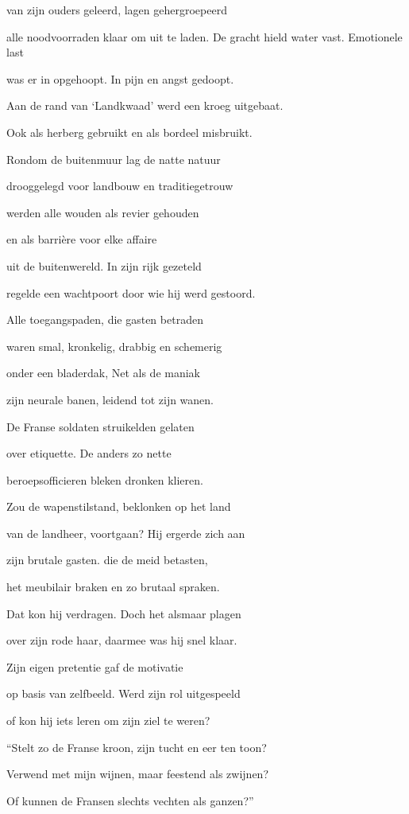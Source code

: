 van zijn ouders geleerd,
lagen gehergroepeerd

alle noodvoorraden
klaar om uit te laden.
De gracht hield water vast.
Emotionele last

was er in opgehoopt.
In pijn en angst gedoopt.

Aan de rand van ‘Landkwaad’
werd een kroeg uitgebaat.

Ook als herberg gebruikt
en als bordeel misbruikt.

Rondom de buitenmuur
lag de natte natuur

drooggelegd voor landbouw
en traditiegetrouw

werden alle wouden
als revier gehouden

en als barrière
voor elke affaire

uit de buitenwereld.
In zijn rijk gezeteld

regelde een wachtpoort
door wie hij werd gestoord.

Alle toegangspaden,
die gasten betraden

waren smal, kronkelig,
drabbig en schemerig

onder een bladerdak,
Net als de maniak

zijn neurale banen,
leidend tot zijn wanen.

De Franse soldaten
struikelden gelaten

over etiquette.
De anders zo nette

beroepsofficieren
bleken dronken klieren.

Zou de wapenstilstand,
beklonken op het land

van de landheer, voortgaan?
Hij ergerde zich aan

zijn brutale gasten.
die de meid betasten,

het meubilair braken
en zo brutaal spraken.

Dat kon hij verdragen.
Doch het alsmaar plagen

over zijn rode haar,
daarmee was hij snel klaar.

Zijn eigen pretentie
gaf de motivatie

op basis van zelfbeeld.
Werd zijn rol uitgespeeld

of kon hij iets leren
om zijn ziel te weren?

“Stelt zo de Franse kroon,
zijn tucht en eer ten toon?

Verwend met mijn wijnen,
maar feestend als zwijnen?

Of kunnen de Fransen
slechts vechten als ganzen?”


